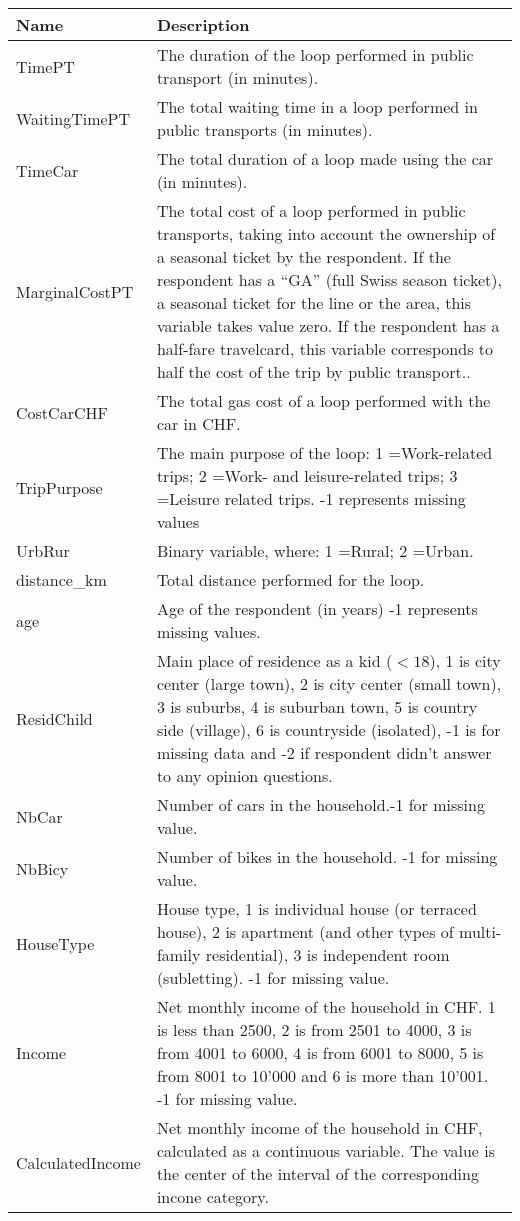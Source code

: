 \documentclass[12pt,a4paper]{article}
\begin{document}
\begin{longtable}{p{4cm}|p{10.5cm}}
		\hline 
		\textbf{Name} & \textbf{Description}\\
		\hline 
		TimePT & The duration of the loop performed in public transport (in minutes).\tabularnewline
		\hline 
		WaitingTimePT & The total waiting time in a loop performed in public transports (in minutes).\tabularnewline
		\hline 
		TimeCar & The total duration of a loop made using the car (in minutes).\tabularnewline
		\hline 
		MarginalCostPT & The total cost of a loop performed in public transports, taking into account the ownership of a seasonal ticket by the respondent. If the respondent has a ``GA'' (full Swiss season ticket), a seasonal ticket for the line or the area, this variable takes value zero. If the respondent has a half-fare travelcard, this variable corresponds to half the cost of the trip by public transport..\tabularnewline
		\hline 
		CostCarCHF & The total gas cost of a loop performed with the car in CHF.\tabularnewline
		\hline 
		TripPurpose & The main purpose of the loop: 1 =Work-related trips; 2 =Work- and leisure-related
		trips; 3 =Leisure related trips. -1 represents missing values \tabularnewline
		\hline 
		UrbRur & Binary variable, where: 1 =Rural; 2 =Urban.\tabularnewline
		\hline 
		distance\_km & Total distance performed for the loop.\tabularnewline
		\hline 
		age & Age of the respondent (in years) -1 represents missing values.\tabularnewline
		\hline 
		ResidChild & Main place of residence as a kid ($<18$), 1 is city center (large town), 2 is city center (small town), 3 is suburbs, 4 is suburban town, 5 is country side (village), 6 is countryside (isolated), -1 is for missing data and -2 if respondent didn't answer to any opinion questions. \tabularnewline
		\hline 
		NbCar & Number of cars in the household.-1 for missing value. \tabularnewline
		\hline 
		NbBicy & Number of bikes in the household. -1 for missing value.\tabularnewline
		\hline 
		HouseType & House type, 1 is individual house (or terraced house), 2 is apartment (and other types of multi-family residential), 3 is independent room (subletting). -1 for missing value.\tabularnewline
		\hline 
		Income & Net monthly income of the household in CHF. 1 is less than 2500, 2 is from 2501 to 4000, 3 is from 4001 to 6000, 4 is from 6001 to 8000, 5 is from 8001 to 10'000 and 6 is more than 10'001. -1 for missing value.\tabularnewline
		\hline 
		CalculatedIncome & Net monthly income of the household in CHF, calculated as a continuous variable. The value is the center of the interval of the corresponding incone category. \tabularnewline

\end{longtable}
\end{document}
